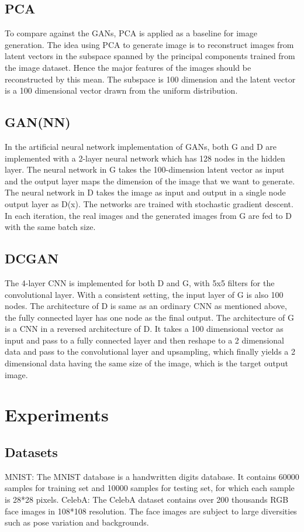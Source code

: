 \documentclass[10pt,twocolumn,letterpaper]{article}
\begin{document}
\subsection{PCA}
To compare against the GANs, PCA is applied as a baseline for image generation. The idea using PCA to generate image is to reconstruct images from latent vectors in the subspace spanned by the principal components trained from the image dataset. Hence the major features of the images should be reconstructed by this mean. The subspace is 100 dimension and the latent vector is a 100 dimensional vector drawn from the uniform distribution.
\subsection{GAN(NN)}
In the artificial neural network implementation of GANs, both G and D are implemented with a 2-layer neural network which has 128 nodes in the hidden layer. The neural network in G takes the 100-dimension latent vector as input and the output layer maps the dimension of the image that we want to generate. The neural network in D takes the image as input and output in a single node output layer as D(x). The networks are trained with stochastic gradient descent. In each iteration, the real images and the generated images from G are fed to D with the same batch size.
\subsection{DCGAN}
The 4-layer CNN is implemented for both D and G, with 5x5 filters for the convolutional layer. With a consistent setting, the input layer of G is also 100 nodes. The architecture of D is same as an ordinary CNN as mentioned above, the fully connected layer has one node as the final output. The architecture of G is a CNN in a reversed architecture of D. It takes a 100 dimensional vector as input and pass to a fully connected layer and then reshape to a 2 dimensional data and pass to the convolutional layer and upsampling, which finally yields a 2 dimensional data having the same size of the image, which is the target output image.

\section{Experiments}
\subsection{Datasets}
MNIST: The MNIST database is a handwritten digits database. It contains 60000 samples for training set and 10000 samples for testing set, for which each sample is 28*28 pixels. 
CelebA: The CelebA dataset contains over 200 thousands RGB face images in 108*108 resolution. The face images are subject to large diversities such as pose variation and backgrounds.
\end{document}
